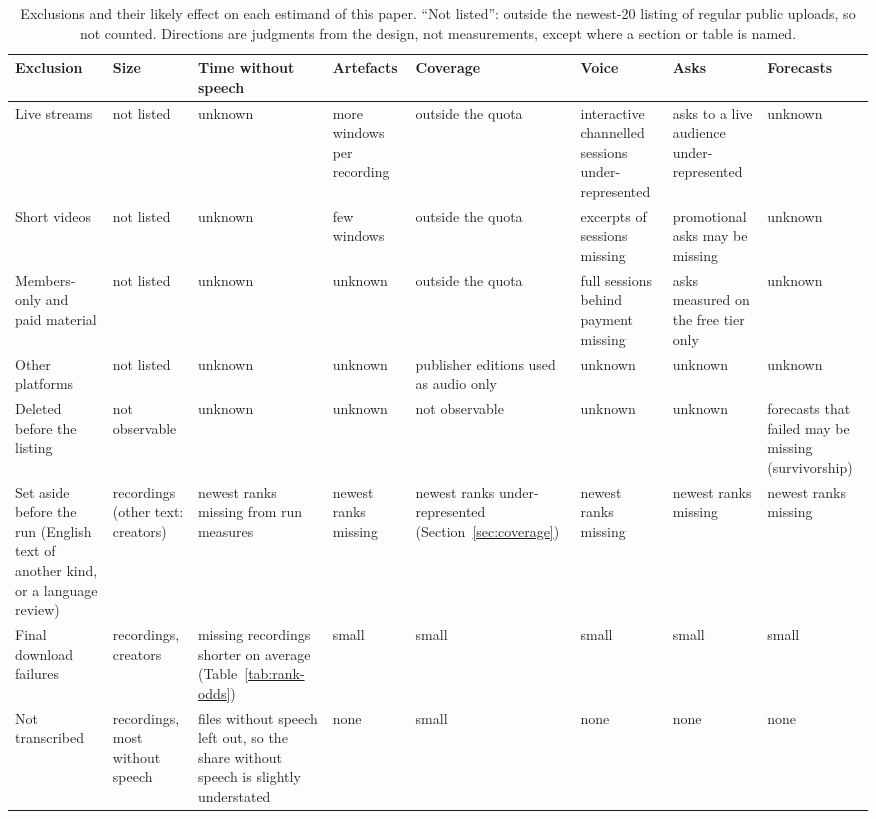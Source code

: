 \begin{table}[tp]
\centering
\footnotesize
\setlength{\tabcolsep}{3pt}
\begin{tabular}{@{}>{\raggedright\arraybackslash}p{}>{\raggedright\arraybackslash}p{}%
>{\raggedright\arraybackslash}p{}>{\raggedright\arraybackslash}p{}%
>{\raggedright\arraybackslash}p{}>{\raggedright\arraybackslash}p{}%
>{\raggedright\arraybackslash}p{}>{\raggedright\arraybackslash}p{}@{}}
\toprule
Exclusion & Size & Time without speech & Artefacts & Coverage & Voice & Asks & Forecasts \\
\midrule
Live streams & not listed & unknown & more windows per recording & outside the quota & interactive channelled sessions under-represented & asks to a live audience under-represented & unknown \\
Short videos & not listed & unknown & few windows & outside the quota & excerpts of sessions missing & promotional asks may be missing & unknown \\
Members-only and paid material & not listed & unknown & unknown & outside the quota & full sessions behind payment missing & asks measured on the free tier only & unknown \\
Other platforms & not listed & unknown & unknown & publisher editions used as audio only & unknown & unknown & unknown \\
Deleted before the listing & not observable & unknown & unknown & not observable & unknown & unknown & forecasts that failed may be missing (survivorship) \\
Set aside before the run (English text of another kind, or a language review) & \NSetAside{} recordings (other text: \NOtherTextCreators{} creators) & newest ranks missing from run measures & newest ranks missing & newest ranks under-represented (Section~\ref{sec:coverage}) & newest ranks missing & newest ranks missing & newest ranks missing \\
Final download failures & \NFailed{} recordings, \NFailedCreators{} creators & missing recordings shorter on average (Table~\ref{tab:rank-odds}) & small & small & small & small & small \\
Not transcribed & \NNotTranscribed{} recordings, most without speech & files without speech left out, so the share without speech is slightly understated & none & small & none & none & none \\
\bottomrule
\end{tabular}
\caption{Exclusions and their likely effect on each estimand of this paper. ``Not listed'': outside the newest-20 listing
of regular public uploads, so not counted. Directions are judgments from the design, not measurements, except where a
section or table is named.}
\label{tab:exclusions}
\end{table}

